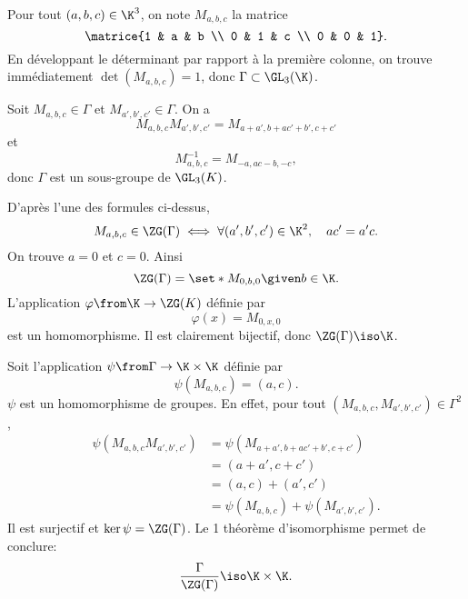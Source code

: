 Pour tout $(a,b,c)\in\K^3$, on note $M_{a,b,c}$ la matrice
\[
  \matrice{1 & a & b \\ 0 & 1 & c \\ 0 & 0 & 1}.
\]
En développant le déterminant par rapport à la première colonne, on trouve
immédiatement $\det(M_{a,b,c}) = 1$, donc $\Gamma\subset\GL_3(\K)$.

Soit $M_{a,b,c}\in\Gamma$ et $M_{a',b',c'}\in\Gamma$. On a
\[
  M_{a,b,c}M_{a',b',c'} = M_{a+a',b+ac'+b',c+c'}
\]
et
\[
  M_{a,b,c}^{-1} = M_{-a,ac-b,-c},
\]
donc $\Gamma$ est un sous-groupe de $\GL_3(K)$. 

D'après l'une des formules ci-dessus,
\[
  M_{a,b,c}\in\ZG(\Gamma) \iff \forall (a',b',c')\in\K^2,\quad ac' = a'c.
\]
On trouve $a=0$ et $c=0$. Ainsi 
\[
  \ZG(\Gamma) 
  = \set*{M_{0,b,0} \given b \in \K}.
\]
L'application $\varphi\from\K\to\ZG(K)$ définie par
%
\[
  \varphi(x) = M_{0,x,0}
\]
%
est un homomorphisme. Il est clairement bijectif, donc $\ZG(\Gamma) \iso \K$.

Soit l'application $\psi\from\Gamma\to\K\times\K$ définie par
%
\[
  \psi(M_{a,b,c}) = (a,c).
\]
%
$\psi$ est un homomorphisme de groupes. En effet, pour tout
$(M_{a,b,c},M_{a',b',c'})\in\Gamma^2$,
%
\begin{align*}
  \psi(M_{a,b,c}M_{a',b',c'}) 
  &= \psi(M_{a+a',b+ac'+b',c+c'}) \\
  &= (a+a',c+c') \\
  &= (a,c)+(a',c') \\
  &= \psi(M_{a,b,c})+\psi(M_{a',b',c'}).
\end{align*}
%
Il est surjectif et 
$\ker\psi = \ZG(\Gamma)$. Le 1 théorème d'isomorphisme permet 
de conclure: 
\[
  \frac{\Gamma}{\ZG(\Gamma)}\iso \K\times\K.
\]

